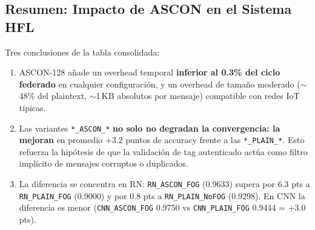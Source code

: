 \subsection{Resumen: Impacto de ASCON en el Sistema HFL}

\begin{table}[H]
\centering
\caption{Resumen del overhead total de ASCON-128 por ronda federada, agregando los promedios de las 4 variantes ASCON y las 4 variantes PLAIN.}
\label{tab:ascon_resumen}
\end{table}

Tres conclusiones de la tabla consolidada:
\begin{enumerate}
    \item ASCON-128 añade un overhead temporal \textbf{inferior al 0.3\% del ciclo federado} en cualquier configuración, y un overhead de tamaño moderado ($\sim$48\% del plaintext, $\sim$1\,KB absolutos por mensaje) compatible con redes IoT típicas.
    \item Las variantes \texttt{*\_ASCON\_*} \textbf{no solo no degradan la convergencia: la mejoran} en promedio $+3.2$ puntos de accuracy frente a las \texttt{*\_PLAIN\_*}. Esto refuerza la hipótesis de que la validación de tag autenticado actúa como filtro implícito de mensajes corruptos o duplicados.
    \item La diferencia se concentra en RN: \texttt{RN\_ASCON\_FOG} (0.9633) supera por 6.3 pts a \texttt{RN\_PLAIN\_FOG} (0.9000) y por 0.8 pts a \texttt{RN\_PLAIN\_NoFOG} (0.9298). En CNN la diferencia es menor (\texttt{CNN\_ASCON\_FOG} 0.9750 vs \texttt{CNN\_PLAIN\_FOG} 0.9444 = $+3.0$ pts).
\end{enumerate}
